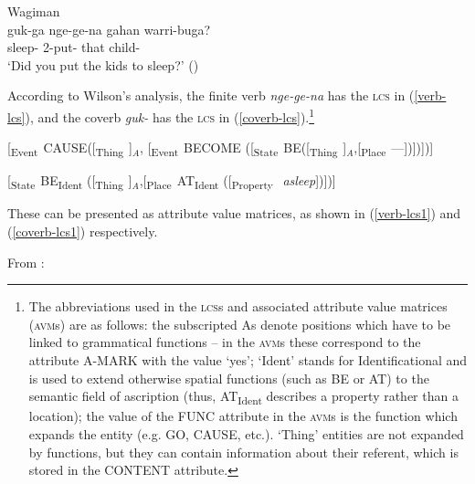 \documentclass[output=paper,hidelinks]{langscibook}
\begin{document}
\ea
\label{wagiman1}Wagiman\\
\gll guk-ga nge-ge-na gahan warri-buga?\\
{sleep-\ASP} {2\SG-put-\PST} {that} {child-\PL}\\
\glt `Did you put the kids to sleep?' (\citealt[136]{Wilson1999})
\z


According to Wilson's analysis, the finite verb {\it nge-ge-na} has the \textsc{lcs} in (\ref{verb-lcs}), and the coverb {\it guk-} has the \textsc{lcs} in (\ref{coverb-lcs}).\footnote{The abbreviations used in the \textsc{lcs}s and associated attribute value matrices (\textsc{avm}s) are as follows: the subscripted As denote positions which have to be linked to grammatical functions -- in the \textsc{avm}s these correspond to the attribute A-MARK with the value `yes'; `Ident' stands for Identificational and is used to extend otherwise spatial functions (such as BE or AT) to the semantic field of ascription (thus, AT\textsubscript{Ident} describes a property rather than a location); the value of the FUNC attribute in the \textsc{avm}s is the function which expands the entity (e.g. GO, CAUSE, etc.). ‘Thing’ entities are not expanded by functions, but they can contain information about their referent, which is stored in the CONTENT attribute.} 

\ea
\label{verb-lcs}
[\textsubscript{Event~}CAUSE\/([\textsubscript{Thing~}]$_A$,
  [\textsubscript{Event~}BECOME ([\textsubscript{State~}BE([\textsubscript{Thing~}]$_A$,[\textsubscript{Place~}---])])])]
\z

\ea
\label{coverb-lcs}
[\textsubscript{State~}BE\textsubscript{Ident}
  ([\textsubscript{Thing~}]$_A$,[\textsubscript{Place~}AT\textsubscript{Ident}
    ([\textsubscript{Property~} \textit{asleep}])])] 
\z

These can be presented as attribute value matrices, as shown in (\ref{verb-lcs1}) and (\ref{coverb-lcs1}) respectively.

\ea
\label{verb-lcs1}
From \citet[145: example (36)]{Wilson1999}:\\
\z
\end{document}
